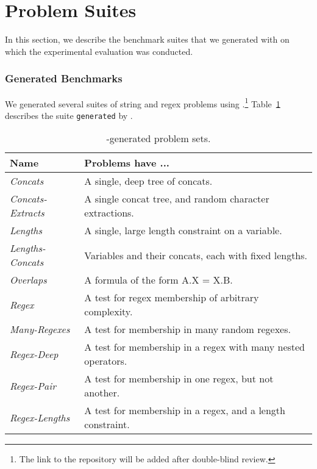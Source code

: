 \section{Problem Suites}
\label{sec:problems}

In this section, we describe the benchmark suites that we generated
with \fuzzer{} on which the experimental evaluation was conducted.

\subsubsection{Generated Benchmarks}

We generated several suites
of string and regex problems using \fuzzer{}.\footnote{The link to the
repository will be added after double-blind review.}
Table~\ref{tbl:generated} describes the suite
\texttt{generated} by \generator{}.
\begin{table}[t]
    \centering
    \caption{\generator{}-generated problem sets.}
    \label{tbl:generated}
    \begin{tabular}{|l|l|}
        \hline
        \textbf{Name}             & \textbf{Problems have ...} \\ \hline
        \textit{Concats}          & A single, deep tree of concats. \\ \hline
        \textit{Concats-Extracts} & A single concat tree, and random character extractions. \\ \hline
        \textit{Lengths}          & A single, large length constraint on a variable. \\ \hline
        \textit{Lengths-Concats}  & Variables and their concats, each with fixed lengths. \\ \hline
        \textit{Overlaps}         & A formula of the form A.X = X.B. \\ \hline
        \textit{Regex}            & A test for regex membership of arbitrary complexity. \\ \hline
        \textit{Many-Regexes}     & A test for membership in many random regexes. \\ \hline
        \textit{Regex-Deep}       & A test for membership in a regex with many nested operators. \\ \hline
        \textit{Regex-Pair}       & A test for membership in one regex, but not another. \\ \hline
        \textit{Regex-Lengths}    & A test for membership in a regex, and a length constraint. \\ \hline
    \end{tabular}
\end{table}

